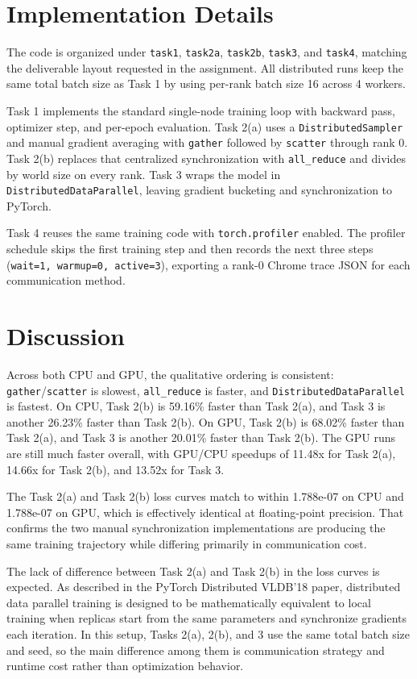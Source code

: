\documentclass[11pt]{article}
\begin{document}
\section{Implementation Details}
The code is organized under \texttt{task1}, \texttt{task2a}, \texttt{task2b}, \texttt{task3}, and \texttt{task4}, matching the deliverable layout requested in the assignment. All distributed runs keep the same total batch size as Task 1 by using per-rank batch size 16 across 4 workers.

Task 1 implements the standard single-node training loop with backward pass, optimizer step, and per-epoch evaluation. Task 2(a) uses a \texttt{DistributedSampler} and manual gradient averaging with \texttt{gather} followed by \texttt{scatter} through rank 0. Task 2(b) replaces that centralized synchronization with \texttt{all\_reduce} and divides by world size on every rank. Task 3 wraps the model in \texttt{DistributedDataParallel}, leaving gradient bucketing and synchronization to PyTorch.

Task 4 reuses the same training code with \texttt{torch.profiler} enabled. The profiler schedule skips the first training step and then records the next three steps (\texttt{wait=1, warmup=0, active=3}), exporting a rank-0 Chrome trace JSON for each communication method.

\section{Discussion}
Across both CPU and GPU, the qualitative ordering is consistent: \texttt{gather}/\texttt{scatter} is slowest, \texttt{all\_reduce} is faster, and \texttt{DistributedDataParallel} is fastest. On CPU, Task 2(b) is 59.16\% faster than Task 2(a), and Task 3 is another 26.23\% faster than Task 2(b). On GPU, Task 2(b) is 68.02\% faster than Task 2(a), and Task 3 is another 20.01\% faster than Task 2(b). The GPU runs are still much faster overall, with GPU/CPU speedups of 11.48x for Task 2(a), 14.66x for Task 2(b), and 13.52x for Task 3.

The Task 2(a) and Task 2(b) loss curves match to within 1.788e-07 on CPU and 1.788e-07 on GPU, which is effectively identical at floating-point precision. That confirms the two manual synchronization implementations are producing the same training trajectory while differing primarily in communication cost.

The lack of difference between Task 2(a) and Task 2(b) in the loss curves is expected. As described in the PyTorch Distributed VLDB'18 paper, distributed data parallel training is designed to be mathematically equivalent to local training when replicas start from the same parameters and synchronize gradients each iteration. In this setup, Tasks 2(a), 2(b), and 3 use the same total batch size and seed, so the main difference among them is communication strategy and runtime cost rather than optimization behavior.
\end{document}
